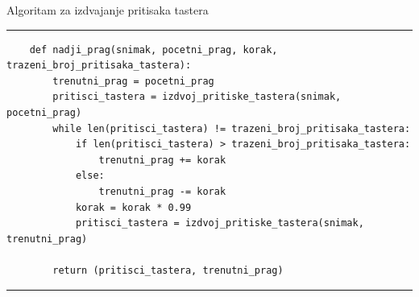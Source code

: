 \documentclass{beamer}
\begin{document}
\begin{frame}[fragile]{Algoritam za izdvajanje pritisaka tastera}
    \rule{\textwidth}{1pt}
    \scriptsize
    \begin{verbatim}
    def nadji_prag(snimak, pocetni_prag, korak, trazeni_broj_pritisaka_tastera):
        trenutni_prag = pocetni_prag
        pritisci_tastera = izdvoj_pritiske_tastera(snimak, pocetni_prag)
        while len(pritisci_tastera) != trazeni_broj_pritisaka_tastera:
            if len(pritisci_tastera) > trazeni_broj_pritisaka_tastera:
                trenutni_prag += korak
            else:
                trenutni_prag -= korak
            korak = korak * 0.99
            pritisci_tastera = izdvoj_pritiske_tastera(snimak, trenutni_prag)
            
        return (pritisci_tastera, trenutni_prag) 
    \end{verbatim}
    \rule{\textwidth}{1pt}
\end{frame}
\end{document}

